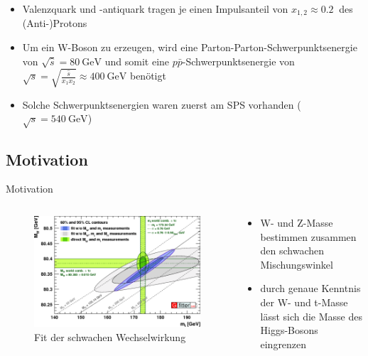 \documentclass[aspectratio=1610, 9pt]{beamer}
\begin{document}
\begin{frame}
  \begin{itemize}
    \item Valenzquark und -antiquark tragen je einen Impulsanteil von $x_{1,2} \approx \SI{0,2}{}$ des (Anti-)Protons
    \item Um ein W-Boson zu erzeugen, wird eine Parton-Parton-Schwerpunktsenergie von $\sqrt{\hat{s}} = \SI{80}{\GeV}$ und somit eine $p \bar{p}$-Schwerpunktsenergie von $\sqrt{s} = \sqrt{\frac{\hat{s}}{x_1 x_2}} \approx \SI{400}{\GeV}$ benötigt
    \item Solche Schwerpunktsenergien waren zuerst am SPS vorhanden ($\sqrt{s} = \SI{540}{\GeV}$)
  \end{itemize}
\end{frame}

\subsection{Motivation}
\begin{frame}{Motivation}
  \begin{columns}
    \begin{column}{0.5\textwidth}
      \begin{figure}
        \includegraphics[width=\textwidth]{images/gfitter.png}
        \caption{Fit der schwachen Wechselwirkung \cite{gfitter}}
        \label{fig:gfitter}
      \end{figure}
    \end{column}
    \begin{column}{0.4\textwidth}
      \begin{itemize}
        \item W- und Z-Masse bestimmen zusammen den schwachen Mischungswinkel
        \item durch genaue Kenntnis der W- und t-Masse lässt sich die Masse des Higgs-Bosons eingrenzen
      \end{itemize}
    \end{column}
  \end{columns}
\end{frame}
\end{document}
